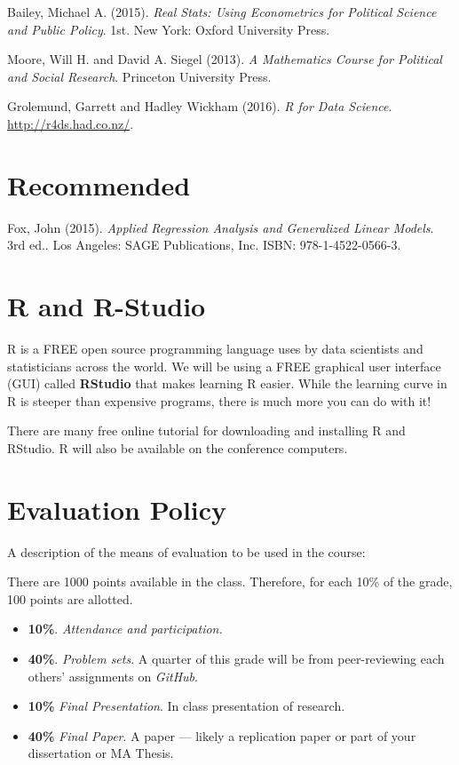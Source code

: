 \documentclass[11pt,]{article}
\begin{document}
 Bailey, Michael A. (2015).
\emph{Real Stats: Using Econometrics for Political
Science and Public Policy}. 1st. New York: Oxford University Press.

 Moore, Will H. and David A. Siegel (2013).
\emph{A Mathematics Course for Political and Social Research}. Princeton
University Press.

 Grolemund, Garrett and Hadley Wickham (2016).
\emph{R for Data Science}. \url{http://r4ds.had.co.nz/}.

\section{Recommended}\label{recommended}

 Fox, John (2015).
\emph{Applied Regression Analysis and Generalized
Linear Models}. 3rd ed.. Los Angeles: SAGE Publications, Inc. ISBN:
978-1-4522-0566-3.

\section{R and R-Studio}\label{r-and-r-studio}

R is a FREE open source programming language uses by data scientists and
statisticians across the world. We will be using a FREE graphical user
interface (GUI) called \textbf{RStudio} that makes learning R easier.
While the learning curve in R is steeper than expensive programs, there
is much more you can do with it!

There are many free online tutorial for downloading and installing R and
RStudio. R will also be available on the conference computers.

\section{Evaluation Policy}\label{evaluation-policy}

A description of the means of evaluation to be used in the course:

There are 1000 points available in the class. Therefore, for each 10\%
of the grade, 100 points are allotted.

\begin{itemize}
\item
  \textbf{10\%}. \emph{Attendance and participation.}
\item
  \textbf{40\%}. \emph{Problem sets}. A quarter of this grade will be
  from peer-reviewing each others' assignments on \emph{GitHub}.
\item
  \textbf{10\%} \emph{Final Presentation}. In class presentation of
  research.
\item
  \textbf{40\%} \emph{Final Paper}. A paper --- likely a replication
  paper or part of your dissertation or MA Thesis.
\end{itemize}
\end{document}
